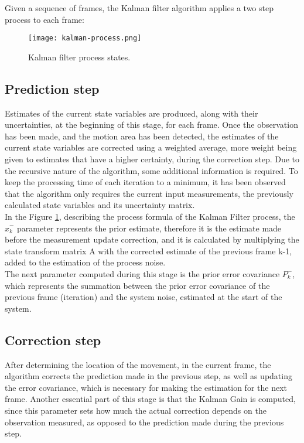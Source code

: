 \documentclass[11pt]{report}
\begin{document}
Given a sequence of frames, the Kalman filter algorithm applies a two step process to each frame:

\begin{figure}
    \centering
    \texttt{[image: kalman-process.png]}
    \caption{Kalman filter process states.}
    \label{fig:kalman-process}
\end{figure}

\subsection{Prediction step}
Estimates of the current state variables are produced, along with their uncertainties, at the beginning of this stage, for each frame. Once the observation has been made, and the motion area has been detected, the estimates of the current state variables are corrected using a weighted average, more weight being given to estimates that have a higher certainty, during the correction step. Due to the recursive nature of the algorithm, some additional information is required. To keep the processing time of each iteration to a minimum, it has been observed that the algorithm only requires the current input measurements, the previously calculated state variables and its uncertainty matrix. \\

In the Figure \ref{fig:kalman-process}, describing the process formula of the Kalman Filter process, the \(\hat{x}_k^-\) parameter represents the prior estimate, therefore it is the estimate made before the measurement update correction, and it is calculated by multiplying the state transform matrix A with the corrected estimate of the previous frame k-1, added to the estimation of the process noise.  \\
The next parameter computed during this stage is the prior error covariance \(P_k^-\), which represents the summation between the prior error covariance of the previous frame (iteration) and the system noise, estimated at the start of the system. \\

\subsection{Correction step}
After determining the location of the movement, in the current frame, the algorithm corrects the prediction made in the previous step, as well as updating the error covariance, which is necessary for making the estimation for the next frame. Another essential part of this stage is that the Kalman Gain is computed, since this parameter sets how much the actual correction depends on the observation measured, as opposed to the prediction made during the previous step. \\
\end{document}
